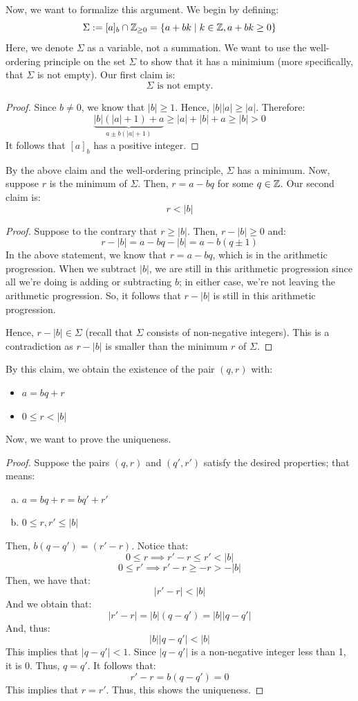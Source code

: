 \documentclass[letterpaper]{article}
\begin{document}
\bigskip 

Now, we want to formalize this argument. We begin by defining: 
\[\Sigma := [a]_b \cap \mathbb{Z}_{\geq 0} = \{a + bk \mid k \in \mathbb{Z}, a + bk \geq 0\}\]
Here, we denote $\Sigma$ as a variable, not a summation. We want to use the well-ordering principle on the set $\Sigma$ to show that it has a minimium (more specifically, that $\Sigma$ is not empty). Our first claim is:
\[\Sigma \text{ is not empty.}\]
\begin{proof}
    Since $b \neq 0$, we know that $|b| \geq 1$. Hence, $|b||a| \geq |a|$. Therefore:
    \[\underbrace{|b|(|a| + 1) + a}_{a \pm b(|a| + 1)} \geq |a| + |b| + a \geq |b| > 0\]
    It follows that $[a]_b$ has a positive integer. 
\end{proof}
By the above claim and the well-ordering principle, $\Sigma$ has a minimum. Now, suppose $r$ is the minimum of $\Sigma$. Then, $r = a - bq$ for some $q \in \mathbb{Z}$. Our second claim is:
\[r < |b|\]
\begin{proof}
    Suppose to the contrary that $r \geq |b|$. Then, $r - |b| \geq 0$ and:
    \[r - |b| = a - bq - |b| = a - b(q \pm 1)\]
    In the above statement, we know that $r = a - bq$, which is in the arithmetic progression. When we subtract $|b|$, we are still in this arithmetic progression since all we're doing is adding or subtracting $b$; in either case, we're not leaving the arithmetic progression. So, it follows that $r - |b|$ is still in this arithmetic progression.

    \bigskip 

    Hence, $r - |b| \in \Sigma$ (recall that $\Sigma$ consists of non-negative integers). This is a contradiction as $r - |b|$ is smaller than the minimum $r$ of $\Sigma$. 
\end{proof}
By this claim, we obtain the existence of the pair $(q, r)$ with:
\begin{itemize}
    \item $a = bq + r$
    \item $0 \leq r < |b|$
\end{itemize}
Now, we want to prove the uniqueness.
\begin{proof}
    Suppose the pairs $(q, r)$ and $(q', r')$ satisfy the desired properties; that means:
    \begin{enumerate}[(a)]
        \item $a = bq + r = bq' + r'$
        \item $0 \leq r, r' \leq |b|$
    \end{enumerate}
    Then, $b(q - q') = (r' - r)$. Notice that:
    \[0 \leq r \implies r' - r \leq r' < |b|\]
    \[0 \leq r' \implies r' - r \geq -r > -|b|\]
    Then, we have that:
    \[|r' - r| < |b|\]
    And we obtain that:
    \[|r' - r| = |b|(q - q') = |b| |q - q'|\]
    And, thus:
    \[|b||q - q'| < |b|\]
    This implies that $|q - q'| < 1$. Since $|q - q'|$ is a non-negative integer less than 1, it is 0. Thus, $q = q'$. It follows that:
    \[r' - r = b(q - q') = 0\]
    This implies that $r = r'$. Thus, this shows the uniqueness. 
\end{proof}
\end{document}
